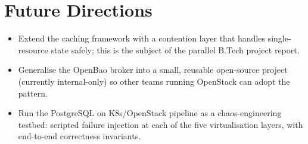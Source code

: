 \documentclass[12pt,a4paper,oneside]{report}
\begin{document}
\section{Future Directions}

\begin{itemize}[leftmargin=*]
    \item Extend the caching framework with a contention layer that handles single-resource state safely; this is the subject of the parallel B.Tech project report.
    \item Generalise the OpenBao broker into a small, reusable open-source project (currently internal-only) so other teams running OpenStack can adopt the pattern.
    \item Run the PostgreSQL on K8s/OpenStack pipeline as a chaos-engineering testbed: scripted failure injection at each of the five virtualisation layers, with end-to-end correctness invariants.
\end{itemize}
\end{document}
